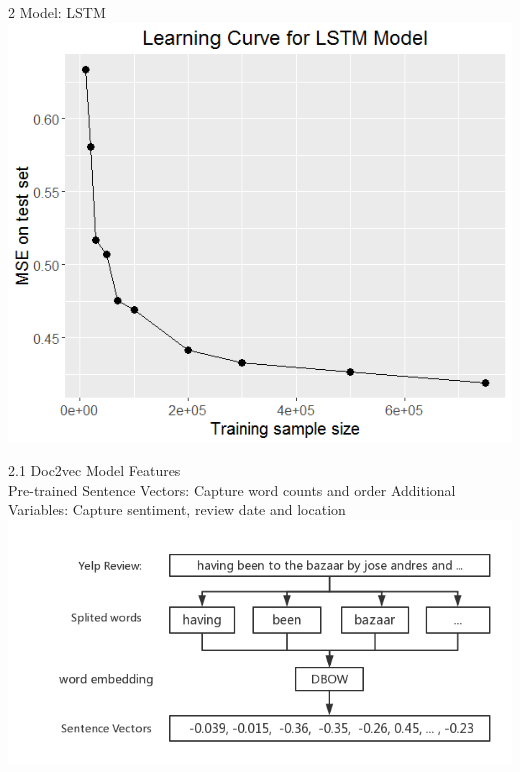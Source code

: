 \documentclass[10pt]{beamer}
\begin{document}
\begin{frame}{2 Model: LSTM}
	\centering
	\includegraphics[scale=0.4]{../image/learning_curve.png}
\end{frame}

\begin{frame}{2.1 Doc2vec}
Model Features\\
Pre-trained Sentence Vectors: Capture word counts and order
\newline
Additional  Variables: Capture sentiment, review date and location
\centering
\includegraphics[scale=0.4]{../image/embedding.png}


\end{frame}
\end{document}
